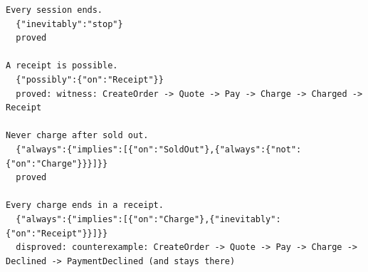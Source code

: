 \begin{lstlisting}[language={},basicstyle=\ttfamily\footnotesize,breaklines=true]
Every session ends.
  {"inevitably":"stop"}
  proved

A receipt is possible.
  {"possibly":{"on":"Receipt"}}
  proved: witness: CreateOrder -> Quote -> Pay -> Charge -> Charged -> Receipt

Never charge after sold out.
  {"always":{"implies":[{"on":"SoldOut"},{"always":{"not":{"on":"Charge"}}}]}}
  proved

Every charge ends in a receipt.
  {"always":{"implies":[{"on":"Charge"},{"inevitably":{"on":"Receipt"}}]}}
  disproved: counterexample: CreateOrder -> Quote -> Pay -> Charge -> Declined -> PaymentDeclined (and stays there)
\end{lstlisting}
